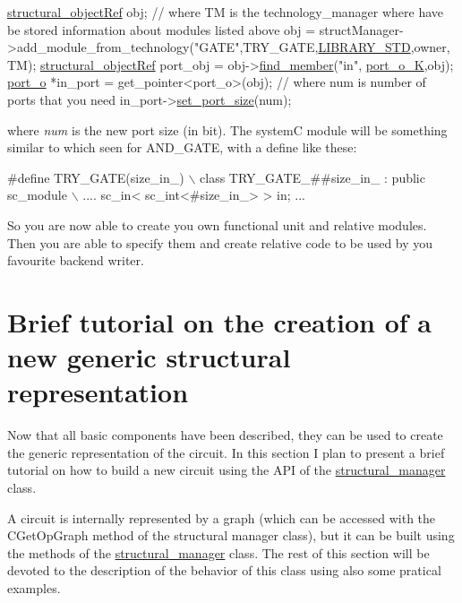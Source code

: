 \begin{DoxyCode}
\hyperlink{structrefcount}{structural\_objectRef} obj;
\textcolor{comment}{// where TM is the technology\_manager where have be stored information about modules listed above}
obj = structManager->add\_module\_from\_technology(\textcolor{stringliteral}{"GATE"},TRY\_GATE,\hyperlink{technology__manager_8hpp_a0033bdd1d1c034f88d486516cd90f614}{LIBRARY\_STD},owner,TM);
\hyperlink{structrefcount}{structural\_objectRef} port\_obj = obj->\hyperlink{classstructural__object_a3a8b2d38c2b5666700053a72868bb6b2}{find\_member}(\textcolor{stringliteral}{"in"},
      \hyperlink{structural__objects_8hpp_acf52399aecacb7952e414c5746ce6439acdcc7e8708a89b5424ed8b41c47f19b0}{port\_o\_K},obj);
\hyperlink{structport__o}{port\_o} *in\_port = get\_pointer<port\_o>(obj);
\textcolor{comment}{// where num is number of ports that you need}
in\_port->\hyperlink{structport__o_a4f8462c05383622e041c2af643ddedf7}{set\_port\_size}(num);
\end{DoxyCode}
 where {\itshape num} is the new port size (in bit). The systemC module will be something similar to which seen for A\+N\+D\+\_\+\+G\+A\+TE, with a define like these\+: 
\begin{DoxyCode}
\textcolor{preprocessor}{#define TRY\_GATE(size\_in\_) \(\backslash\)}
\textcolor{preprocessor}{class TRY\_GATE\_##size\_in\_ : public sc\_module \(\backslash\)}
\textcolor{preprocessor}{....}
sc\_in< sc\_int<#size\_in\_> > in;
...
\end{DoxyCode}


So you are now able to create you own functional unit and relative modules. Then you are able to specify them and create relative code to be used by you favourite backend writer.\hypertarget{src_circuit_page_circuit_creation_how_to}{}\section{Brief tutorial on the creation of a new generic structural representation}\label{src_circuit_page_circuit_creation_how_to}
Now that all basic components have been described, they can be used to create the generic representation of the circuit. In this section I plan to present a brief tutorial on how to build a new circuit using the A\+PI of the \hyperlink{classstructural__manager}{structural\+\_\+manager} class.

A circuit is internally represented by a graph (which can be accessed with the C\+Get\+Op\+Graph method of the structural manager class), but it can be built using the methods of the \hyperlink{classstructural__manager}{structural\+\_\+manager} class. The rest of this section will be devoted to the description of the behavior of this class using also some pratical examples.


